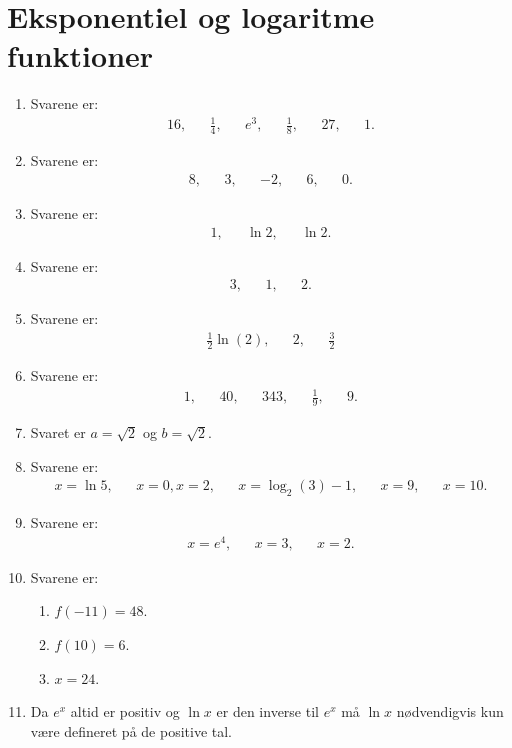 \section{Eksponentiel og logaritme funktioner}
\begin{enumerate}
	\item Svarene er:
	\begin{align*}
	16,&& \frac{1}{4},&& e^3, &&\frac{1}{8},&&27,&& 1.
	\end{align*}
	\item Svarene er:
	\begin{align*}
	8,&& 3,&& -2,&& 6,&&0.
	\end{align*}
	\item Svarene er:
	\begin{align*}
	1,&&\ln 2,&&\ln 2.
	\end{align*}
	\item Svarene er:
	\begin{align*}
	3,&& 1,&& 2.
	\end{align*}
	\item Svarene er:
	\begin{align*}
	\frac{1}{2}\ln(2),&& 2,&&\frac{3}{2}
	\end{align*}
	\item Svarene er:
	\begin{align*}
	1,&&40,&& 343,&& \frac{1}{9},&& 9.
	\end{align*}
	\item Svaret er $a=\sqrt{2}$ og $b=\sqrt{2}$.
	
	\item Svarene er:
	\begin{align*}
	x=\ln 5,&& x=0,x=2,&& x=\log_2(3)-1,&& x=9,&&x=10.
	\end{align*}
	
	\item Svarene er:
	\begin{align*}
	x=e^4,&& x=3,&&x=2.
	\end{align*}
	
	\item Svarene er:
	\begin{enumerate}
		\item $f(-11)=48$.
		\item $f(10)=6$.
		\item $x=24$.
	\end{enumerate}
	
	\item Da $e^x$ altid er positiv og $\ln x$ er den inverse til $e^x$ må $\ln x$ nødvendigvis kun være defineret på de positive tal. 
	

\end{enumerate}
